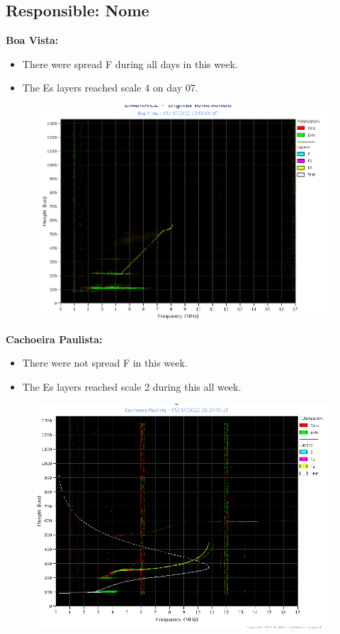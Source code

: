 \documentclass[a4paper, 10pt]{article}
\begin{document}
 \subsection{Responsible: Nome} 
 
\textbf{Boa Vista: }

 \begin{itemize}
\item There were spread F during all days in this week.
\item The Es layers reached scale 4 on day 07. 
\end{itemize}
\begin{figure}[H]
    \centering
    \includegraphics[width=14cm]{./figures//BoaVista.png}
\end{figure}

\textbf{Cachoeira Paulista:}

 \begin{itemize}
\item There were not spread F in this week.
\item The Es layers reached scale 2 during this all week. 
\end{itemize}
\begin{figure}[H]
    \centering
    \includegraphics[width=14cm]{./figures//CachoeiraPaulista.png}
\end{figure}
\end{document}
